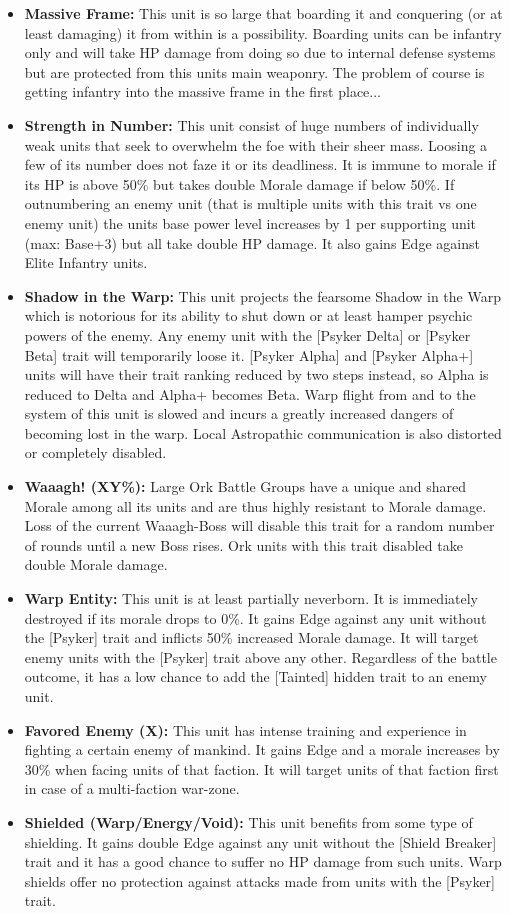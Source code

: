 \begin{itemize}
 	\item \textbf{Massive Frame:} This unit is so large that boarding it and conquering (or at least damaging) it from within is a possibility. Boarding units can be infantry only and will take HP damage from doing so due to internal defense systems but are protected from this units main weaponry. The problem of course is getting infantry into the massive frame in the first place...
 	\item \textbf{Strength in Number:} This unit consist of huge numbers of individually weak units that seek to overwhelm the foe with their sheer mass. Loosing a few of its number does not faze it or its deadliness. It is immune to morale if its HP is above 50\% but takes double Morale damage if below 50\%. If outnumbering an enemy unit (that is multiple units with this trait vs one enemy unit) the units base power level increases by 1 per supporting unit (max: Base+3) but all take double HP damage. It also gains Edge against Elite Infantry units.
 	\item \textbf{Shadow in the Warp:} This unit projects the fearsome Shadow in the Warp which is notorious for its ability to shut down or at least hamper psychic powers of the enemy. Any enemy unit with the [Psyker Delta] or [Psyker Beta] trait will temporarily loose it. [Psyker Alpha] and [Psyker Alpha+] units will have their trait ranking reduced by two steps instead, so Alpha is reduced to Delta and Alpha+ becomes Beta. Warp flight from and to the system of this unit is slowed and incurs a greatly increased dangers of becoming lost in the warp. Local Astropathic communication is also distorted or completely disabled.
 	\item \textbf{Waaagh! (XY\%):} Large Ork Battle Groups have a unique and shared Morale among all its units and are thus highly resistant to Morale damage. Loss of the current Waaagh-Boss will disable this trait for a random number of rounds until a new Boss rises. Ork units with this trait disabled take double Morale damage.
 	\item \textbf{Warp Entity:} This unit is at least partially neverborn. It is immediately destroyed if its morale drops to 0\%. It gains Edge against any unit without the [Psyker] trait and inflicts 50\% increased Morale damage. It will target enemy units with the [Psyker] trait above any other. Regardless of the battle outcome, it has a low chance to add the [Tainted] hidden trait to an enemy unit.
 	\item \textbf{Favored Enemy (X):} This unit has intense training and experience in fighting a certain enemy of mankind. It gains Edge and a morale increases by 30\% when facing units of that faction. It will target units of that faction first in case of a multi-faction war-zone.
 	\item \textbf{Shielded (Warp/Energy/Void):} This unit benefits from some type of shielding. It gains double Edge against any unit without the [Shield Breaker] trait and it has a good chance to suffer no HP damage from such units. Warp shields offer no protection against attacks made from units with the [Psyker] trait.
\end{itemize}

